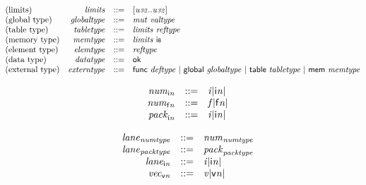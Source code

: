 \vspace{1ex}

$$
\begin{array}{@{}lrrl@{}l@{}}
\mbox{(limits)} & {\mathit{limits}} &::=& [{\mathit{u{\scriptstyle32}}} .. {\mathit{u{\scriptstyle32}}}] \\
\mbox{(global type)} & {\mathit{globaltype}} &::=& {\mathit{mut}}~{\mathit{valtype}} \\
\mbox{(table type)} & {\mathit{tabletype}} &::=& {\mathit{limits}}~{\mathit{reftype}} \\
\mbox{(memory type)} & {\mathit{memtype}} &::=& {\mathit{limits}}~\mathsf{i{\scriptstyle8}} \\
\mbox{(element type)} & {\mathit{elemtype}} &::=& {\mathit{reftype}} \\
\mbox{(data type)} & {\mathit{datatype}} &::=& \mathsf{ok} \\
\mbox{(external type)} & {\mathit{externtype}} &::=& \mathsf{func}~{\mathit{deftype}} ~|~ \mathsf{global}~{\mathit{globaltype}} ~|~ \mathsf{table}~{\mathit{tabletype}} ~|~ \mathsf{mem}~{\mathit{memtype}} \\
\end{array}
$$

\vspace{1ex}

\vspace{1ex}

\vspace{1ex}

$$
\begin{array}{@{}lrrl@{}l@{}}
& {{\mathit{num}}}_{{\mathsf{i}}{{\mathit{n}}}} &::=& {{\mathit{i}}}{{|{\mathsf{i}}{{\mathit{n}}}|}} \\
& {{\mathit{num}}}_{{\mathsf{f}}{{\mathit{n}}}} &::=& {{\mathit{f}}}{{|{\mathsf{f}}{{\mathit{n}}}|}} \\
& {{\mathit{pack}}}_{{\mathsf{i}}{{\mathit{n}}}} &::=& {{\mathit{i}}}{{|{\mathsf{i}}{{\mathit{n}}}|}} \\
\end{array}
$$

$$
\begin{array}{@{}lrrl@{}l@{}}
& {{\mathit{lane}}}_{{\mathit{numtype}}} &::=& {{\mathit{num}}}_{{\mathit{numtype}}} \\
& {{\mathit{lane}}}_{{\mathit{packtype}}} &::=& {{\mathit{pack}}}_{{\mathit{packtype}}} \\
& {{\mathit{lane}}}_{{\mathsf{i}}{{\mathit{n}}}} &::=& {{\mathit{i}}}{{|{\mathsf{i}}{{\mathit{n}}}|}} \\
& {{\mathit{vec}}}_{{\mathsf{v}}{{\mathit{n}}}} &::=& {{\mathit{v}}}{{|{\mathsf{v}}{{\mathit{n}}}|}} \\
\end{array}
$$

